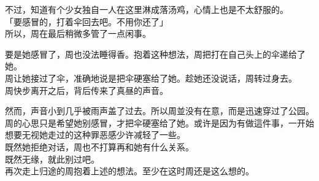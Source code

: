 不过，知道有个少女独自一人在这里淋成落汤鸡，心情上也是不太舒服的。\\

「要感冒的，打着伞回去吧。不用你还了」\\

所以，周在最后稍微多管了一点闲事。

要是她感冒了，周也没法睡得香。抱着这种想法，周把打在自己头上的伞递给了她。\\

周让她接过了伞，准确地说是把伞硬塞给了她。趁她还没说话，周转过身去。\\

周快步离开之后，背后传来了真昼的声音。

然而，声音小到几乎被雨声盖了过去。所以周並没有在意，而是迅速穿过了公园。\\

周的心思只是希望她别感冒，才把伞硬塞给了她。或许是因为有做這件事，一开始想要无视她走过的这种罪恶感少许减轻了一些。\\

既然她拒绝对话，周也不打算再和她有什么关系。\\

既然无缘，就此别过吧。\\

再次走上归途的周抱着上述的想法。至少在这时周还是这么想的。
